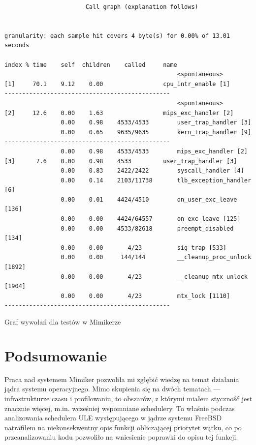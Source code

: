 \documentclass[shortabstract]{iithesis}
\theoremstyle{definition} \newtheorem*{definition}{Definicja}
\theoremstyle{definition} \newtheorem*{example}{Przykład}
\theoremstyle{definition} \newtheorem*{remark}{Uwaga}
\newenvironment{longlisting}{\captionsetup{type=listing}}{}
\begin{document}
\begin{longlisting}
  \begin{verbatim}
                       Call graph (explanation follows)


granularity: each sample hit covers 4 byte(s) for 0.00% of 13.01 seconds

index % time    self  children    called     name
                                                 <spontaneous>
[1]     70.1    9.12    0.00                 cpu_intr_enable [1]
-----------------------------------------------
                                                 <spontaneous>
[2]     12.6    0.00    1.63                 mips_exc_handler [2]
                0.00    0.98    4533/4533        user_trap_handler [3]
                0.00    0.65    9635/9635        kern_trap_handler [9]
-----------------------------------------------
                0.00    0.98    4533/4533        mips_exc_handler [2]
[3]      7.6    0.00    0.98    4533         user_trap_handler [3]
                0.00    0.83    2422/2422        syscall_handler [4]
                0.00    0.14    2103/11738       tlb_exception_handler [6]
                0.00    0.01    4424/4510        on_user_exc_leave [136]
                0.00    0.00    4424/64557       on_exc_leave [125]
                0.00    0.00    4533/82618       preempt_disabled [134]
                0.00    0.00       4/23          sig_trap [533]
                0.00    0.00     144/144         __cleanup_proc_unlock [1892]
                0.00    0.00       4/23          __cleanup_mtx_unlock [1904]
                0.00    0.00       4/23          mtx_lock [1110]
-----------------------------------------------
  \end{verbatim}
  \caption{Graf wywołań dla testów w Mimikerze}
  \label{lst:callgraphmimiker}
\end{longlisting}
\chapter{Podsumowanie}

Praca nad systemem Mimiker pozwoliła mi zgłębić wiedzę na temat działania jądra systemu operacyjnego. Mimo skupienia się na dwóch tematach --- infrastrukturze czasu i profilowaniu, to obszarów, z którymi miałem styczność jest znacznie więcej, m.in. wcześniej wspomniane schedulery. To właśnie podczas analizowania schedulera ULE występującego w jądrze systemu FreeBSD natrafiłem na niekonsekwentny opis funkcji obliczającej priorytet wątku, co po przeanalizowaniu kodu pozwoliło na wniesienie poprawki do opisu tej funkcji.
\end{document}
